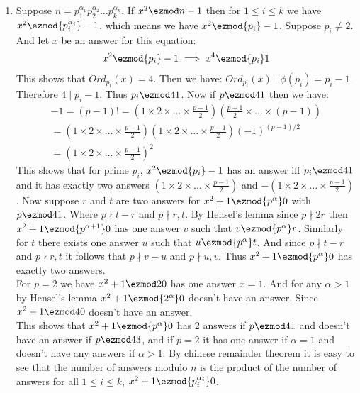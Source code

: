 \begin{enumerate}[label=]
    \item 
        Suppose $n = p_1^{\alpha_1} p_2^{\alpha_2} \dots p_k^{\alpha_k}$. If $x^2 \ezmod n -1$ then for $1 \le i \le k$ we have $x^2 \ezmod{p_i^{\alpha_i}} -1$, which means we have $x^2 \ezmod{p_i} -1$. Suppose $p_i \ne 2$. And let $x$ be an answer for this equation:
        \begin{gather*}
            x^2 \ezmod{p_i} -1 \implies x^4 \ezmod{p_i} 1
        \end{gather*}
        This shows that $Ord_{p_i}(x) = 4$. Then we have: $Ord_{p_i}(x) \mid \phi(p_i) = p_i - 1$. Therefore $4 \mid p_i - 1$. Thus $p_i \ezmod 4 1$. Now if $p \ezmod 4 1$ then we have: 
        \begin{gather*}
            -1 = (p - 1)! = (1 \times 2 \times \dots \times \frac{p - 1}{2})(\frac{p + 1}{2} \times \dots \times (p - 1)) \\
            = (1 \times 2 \times \dots \times \frac{p - 1}{2})(1 \times 2 \times \dots \times \frac{p - 1}{2}) (-1)^{(p - 1)/2}  \\
            = (1 \times 2 \times \dots \times \frac{p - 1}{2})^2
        \end{gather*}
        This shows that for prime $p_i$, $x^2 \ezmod{p_i} -1$ has an answer iff $p_i \ezmod 4 1$ and it has exactly two answers $(1 \times 2 \times \dots \times \frac{p - 1}{2})$ and $-(1 \times 2 \times \dots \times \frac{p - 1}{2})$. Now suppose $r$ and $t$ are two answers for $x^2 + 1 \ezmod{p^\alpha} 0$ with $p \ezmod 4 1$. Where $p \nmid t - r$ and $p \nmid r, t$. By Hensel's lemma since $p \nmid 2r$ then $x^2 + 1 \ezmod{p^{\alpha + 1}} 0$ has one answer $v$ such that $v \ezmod{p^\alpha} r$. Similarly for $t$ there exists one answer $u$ such that $u \ezmod{p^\alpha} t$. And since $p \nmid t - r$ and $p \nmid r, t$ it follows that $p \nmid v - u$ and $p \nmid u, v$. Thus $x^2 + 1 \ezmod{p^\alpha} 0$ has exactly two answers. \\
        For $p = 2$ we have $x^2 + 1 \ezmod 2 0$ has one answer $x = 1$. And for any $\alpha > 1$ by Hensel's lemma $x^2 + 1 \ezmod{2^\alpha} 0$ doesn't have an answer. Since $x^2 + 1 \ezmod 4 0$ doesn't have an answer. \\
        This shows that $x^2 + 1 \ezmod{p^\alpha} 0$ has 2 answers if $p \ezmod 4 1$ and doesn't have an answer if $p \ezmod 4 3$, and if $p = 2$ it has one answer if $\alpha = 1$ and doesn't have any answers if $\alpha > 1$. By chinese remainder theorem it is easy to see that the number of answers modulo $n$ is the product of the number of answers for all $1 \le i \le k$, $x^2 + 1 \ezmod{p_i^{\alpha_i}} 0$.
\end{enumerate}